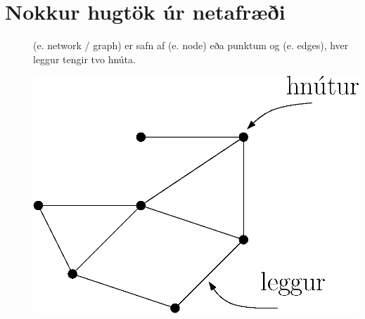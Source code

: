 \section{Nokkur hugtök úr netafræði}

\begin{description}
 \item[] (e. network / graph) er safn af  (e. node) eða punktum og  (e. edges), hver leggur tengir tvo hnúta.
\begin{center} \includegraphics[width=0.37\columnwidth]{figs/network.eps} \end{center}


\end{description}
